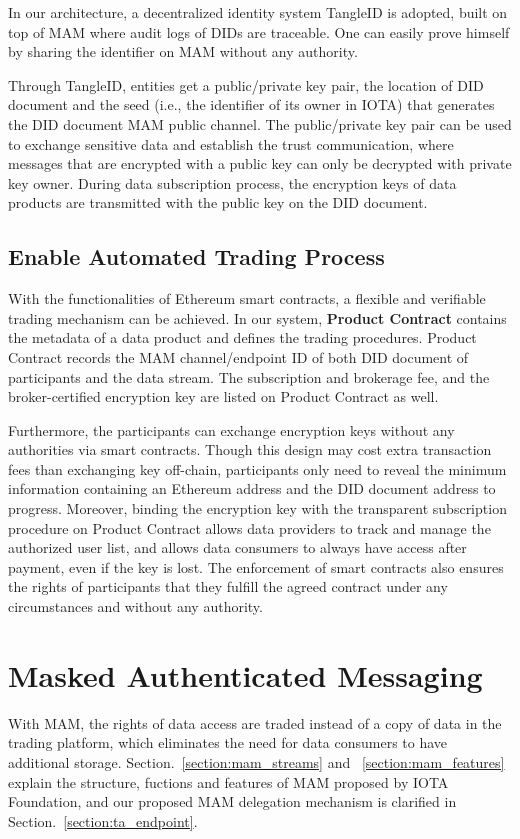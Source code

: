 \documentclass[conference]{IEEEtran}
\begin{document}
In our architecture, a decentralized identity system TangleID\cite{TangleID} is adopted, built on top of MAM where audit logs of DIDs are traceable. One can easily prove himself by sharing the identifier on MAM without any authority.

Through TangleID, entities get a public/private key pair, the location of DID document and the seed (i.e., the identifier of its owner in IOTA) that generates the DID document MAM public channel. The public/private key pair can be used to exchange sensitive data and establish the trust communication, where messages that are encrypted with a public key can only be decrypted with private key owner. During data subscription process, the encryption keys of data products are transmitted with the public key on the DID document.

\subsection{Enable Automated Trading Process}
With the functionalities of Ethereum smart contracts, a flexible and verifiable trading mechanism can be achieved. In our system, \textbf{Product Contract} contains the metadata of a data product and defines the trading procedures. Product Contract records the MAM channel/endpoint ID of both DID document of participants and the data stream. The subscription and brokerage fee, and the broker-certified encryption key are listed on Product Contract as well. 

Furthermore, the participants can exchange encryption keys without any authorities via smart contracts. Though this design may cost extra transaction fees than exchanging key off-chain, participants only need to reveal the minimum information containing an Ethereum address and the DID document address to progress. Moreover, binding the encryption key with the transparent subscription procedure on Product Contract allows data providers to track and manage the authorized user list, and allows data consumers to always have access after payment, even if the key is lost. The enforcement of smart contracts also ensures the rights of participants that they fulfill the agreed contract under any circumstances and without any authority.

\section{Masked Authenticated Messaging}
\label{section:MAM}
With MAM, the rights of data access are traded instead of a copy of data in the trading platform, which eliminates the need for data consumers to have additional storage. Section.~\ref{section:mam_streams} and ~\ref{section:mam_features} explain the structure, fuctions and features of MAM proposed by IOTA Foundation, and our proposed MAM delegation mechanism is clarified in Section.~\ref{section:ta_endpoint}.
\end{document}
